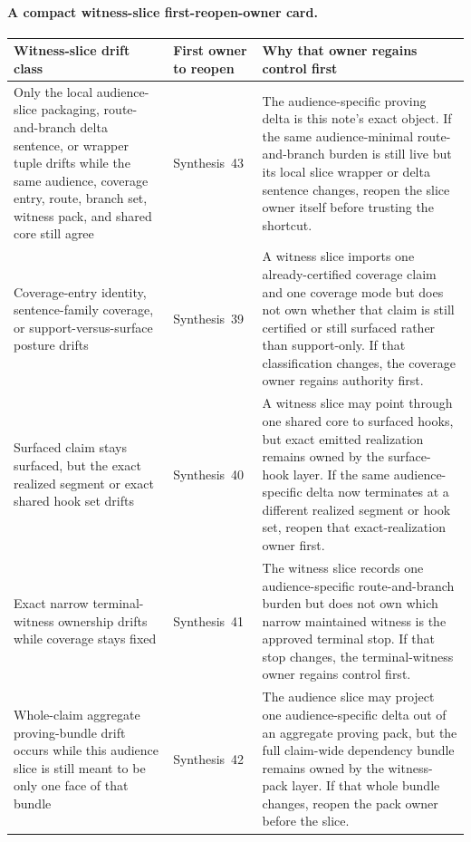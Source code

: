 \documentclass[11pt]{article}
\begin{document}
\paragraph{A compact witness-slice first-reopen-owner card.}
\begin{table}[t]
\centering
\small
\begin{tabularx}{\linewidth}{@{}L Y Y@{}}
\toprule
Witness-slice drift class & First owner to reopen & Why that owner regains control first \\
\midrule
Only the local audience-slice packaging, route-and-branch delta sentence, or wrapper tuple drifts while the same audience, coverage entry, route, branch set, witness pack, and shared core still agree & Synthesis~43 & The audience-specific proving delta is this note's exact object. If the same audience-minimal route-and-branch burden is still live but its local slice wrapper or delta sentence changes, reopen the slice owner itself before trusting the shortcut. \\
Coverage-entry identity, sentence-family coverage, or support-versus-surface posture drifts & Synthesis~39 & A witness slice imports one already-certified coverage claim and one coverage mode but does not own whether that claim is still certified or still surfaced rather than support-only. If that classification changes, the coverage owner regains authority first. \\
Surfaced claim stays surfaced, but the exact realized segment or exact shared hook set drifts & Synthesis~40 & A witness slice may point through one shared core to surfaced hooks, but exact emitted realization remains owned by the surface-hook layer. If the same audience-specific delta now terminates at a different realized segment or hook set, reopen that exact-realization owner first. \\
Exact narrow terminal-witness ownership drifts while coverage stays fixed & Synthesis~41 & The witness slice records one audience-specific route-and-branch burden but does not own which narrow maintained witness is the approved terminal stop. If that stop changes, the terminal-witness owner regains control first. \\
Whole-claim aggregate proving-bundle drift occurs while this audience slice is still meant to be only one face of that bundle & Synthesis~42 & The audience slice may project one audience-specific delta out of an aggregate proving pack, but the full claim-wide dependency bundle remains owned by the witness-pack layer. If that whole bundle changes, reopen the pack owner before the slice. \\

\end{tabularx}
\end{table}
\end{document}
